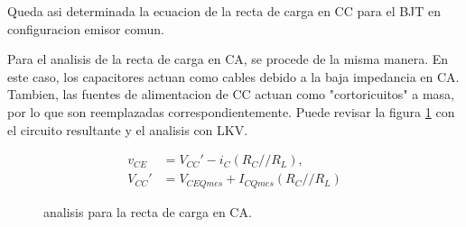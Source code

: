     Queda asi determinada la ecuacion de la recta de carga en CC para el BJT en configuracion emisor comun.

    Para el analisis de la recta de carga en CA, se procede de la misma manera. En este caso, los capacitores actuan
    como cables debido a la baja impedancia en CA. Tambien, las fuentes de alimentacion de CC actuan como
    "cortoricuitos" a masa, por lo que son reemplazadas correspondientemente. Puede revisar la figura \ref{fig:recta_ca}
    con el circuito resultante y el analisis con LKV.
    \begin{figure}[H]
      \centering
      \begin{minipage}{0.49\textwidth}
      \end{minipage}
      \begin{minipage}{0.49\textwidth}
        \begin{align*}
          v_{CE} &= V_{CC}' - i_C (R_C//R_L),\\[6pt]
          V_{CC}' &= V_{CEQ mes} + I_{CQ mes} (R_C//R_L)
        \end{align*}
      \end{minipage}
      \caption{analisis para la recta de carga en CA.}
      \label{fig:recta_ca}
    \end{figure}


